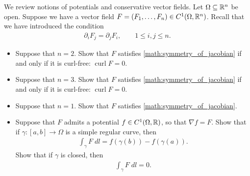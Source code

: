\documentclass[11pt]{article}
\begin{document}



\begin{exercise}
    We review notions of potentials and conservative vector fields. Let $\Omega \subseteq \mathbb{R}^n$ be open.
    Suppose we have a vector field $F = (F_1,\dots,F_n) \in C^1(\Omega,\mathbb{R}^n)$.
	Recall that we have introduced the condition
    \begin{align}\label{math:symmetry_of_jacobian}
        \partial_i F_j = \partial_j F_i, \qquad 1 \leq i,j \leq n.
    \end{align}
    \begin{itemize}
     \item Suppose that $n=2$. Show that $F$ satisfies \eqref{math:symmetry_of_jacobian} if and only if it is curl-free: $\operatorname{curl} F = 0$.
     \item Suppose that $n=3$. Show that $F$ satisfies \eqref{math:symmetry_of_jacobian} if and only if it is curl-free: $\operatorname{curl} F = 0$.
     \item Suppose that $n=1$. Show that $F$ satisfies \eqref{math:symmetry_of_jacobian}.
     \item Suppose that $F$ admits a potential $f \in C^1(\Omega,\mathbb{R})$, so that $\nabla f = F$. 
     Show that if $\gamma : [a,b] \rightarrow \Omega$ is a simple regular curve, then 
     \begin{align}
        \int_\gamma F \;dl = f(\gamma(b)) - f(\gamma(a)).
     \end{align}
     Show that if $\gamma$ is closed, then 
     \begin{align}
        \int_\gamma F \;dl = 0.
     \end{align}
    \end{itemize}
\end{exercise}
\begin{solution}
    
\end{solution}
\end{document}
